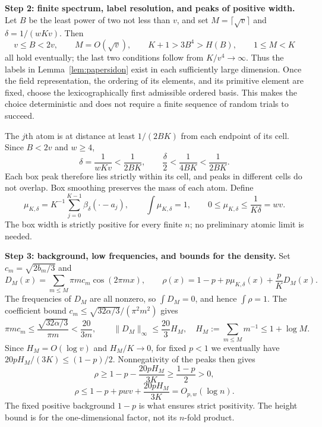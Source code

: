 \documentclass[a4paper,11pt]{article}
\theoremstyle{remark}
\begin{document}
\textbf{Step 2: finite spectrum, label resolution, and peaks of positive width.}
Let $B$ be the least power of two not less than $v$, and set
$M=\lceil\sqrt v\rceil$ and $\delta=1/(wKv)$. Then
\[
 v\le B<2v,\qquad M=O(\sqrt v),\qquad
 K+1>3B^4>H(B),\qquad1\le M<K
\]
all hold eventually; the last two conditions follow from $K/v^4\to\infty$.
Thus the labels in Lemma~\ref{lem:papersidon} exist in each sufficiently
large dimension. Once the field representation, the ordering of its
elements, and its primitive element are fixed, choose the lexicographically
first admissible ordered basis. This makes the choice deterministic and
does not require a finite sequence of random trials to succeed.

The $j$th atom is at distance at least $1/(2BK)$ from each endpoint of
its cell. Since $B<2v$ and $w\ge4$,
\[
 \delta=\frac1{wKv}<\frac1{2BK},\qquad
 \frac\delta2<\frac1{4BK}<\frac1{2BK}.
\]
Each box peak therefore lies strictly within its cell, and peaks in
different cells do not overlap. Box smoothing preserves the mass of
each atom. Define
\[
 \mu_{K,\delta}=K^{-1}\sum_{j=0}^{K-1}\beta_\delta(\cdot-a_j),
 \qquad \int\mu_{K,\delta}=1,
 \qquad0\le\mu_{K,\delta}\le\frac1{K\delta}=wv.
\]
The box width is strictly positive for every finite $n$; no preliminary
atomic limit is needed.

\textbf{Step 3: background, low frequencies, and bounds for the density.}
Set $c_m=\sqrt{2b_m/3}$ and
\[
 D_M(x)=\sum_{m\le M}\pi m c_m\cos(2\pi mx),
 \qquad\rho(x)=1-p+p\mu_{K,\delta}(x)+\frac pK D_M(x).
\]
The frequencies of $D_M$ are all nonzero, so $\int D_M=0$, and hence
$\int\rho=1$. The coefficient bound
$c_m\le\sqrt{32\alpha/3}/(\pi^2m^2)$ gives
\[
 \pi m c_m\le\frac{\sqrt{32\alpha/3}}{\pi m}<\frac{20}{3m},
 \qquad\|D_M\|_\infty\le\frac{20}3H_M,
 \quad H_M:=\sum_{m\le M}m^{-1}\le1+\log M.
\]
Since $H_M=O(\log v)$ and $H_M/K\to0$, for fixed $p<1$ we eventually
have $20pH_M/(3K)\le(1-p)/2$. Nonnegativity of the peaks then gives
\[
 \rho\ge1-p-\frac{20pH_M}{3K}\ge\frac{1-p}{2}>0,
\]
\[
 \rho\le1-p+pwv+\frac{20pH_M}{3K}=O_{p,w}(\log n).
\]
The fixed positive background $1-p$ is what ensures strict positivity.
The height bound is for the one-dimensional factor, not its $n$-fold
product.
\end{document}
